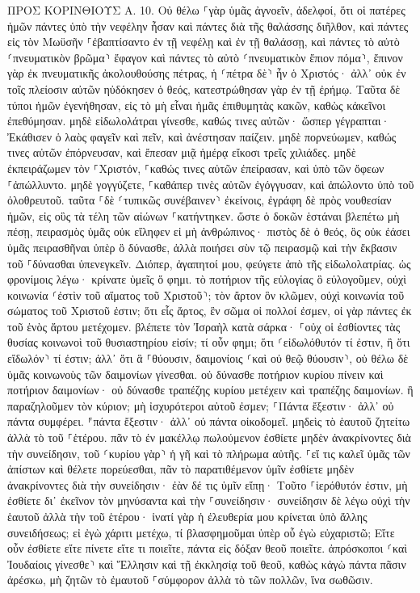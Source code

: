 \documentclass[twoside, 9pt]{extreport}
\begin{document}
ΠΡΟΣ ΚΟΡΙΝΘΙΟΥΣ Α.
10.
Οὐ θέλω ⸀γὰρ ὑμᾶς ἀγνοεῖν, ἀδελφοί, ὅτι οἱ πατέρες ἡμῶν πάντες ὑπὸ τὴν νεφέλην ἦσαν καὶ πάντες διὰ τῆς θαλάσσης διῆλθον, 
καὶ πάντες εἰς τὸν Μωϋσῆν ⸀ἐβαπτίσαντο ἐν τῇ νεφέλῃ καὶ ἐν τῇ θαλάσσῃ, 
καὶ πάντες τὸ αὐτὸ ⸂πνευματικὸν βρῶμα⸃ ἔφαγον 
καὶ πάντες τὸ αὐτὸ ⸂πνευματικὸν ἔπιον πόμα⸃, ἔπινον γὰρ ἐκ πνευματικῆς ἀκολουθούσης πέτρας, ἡ ⸂πέτρα δὲ⸃ ἦν ὁ Χριστός· 
ἀλλ᾽ οὐκ ἐν τοῖς πλείοσιν αὐτῶν ηὐδόκησεν ὁ θεός, κατεστρώθησαν γὰρ ἐν τῇ ἐρήμῳ. 
Ταῦτα δὲ τύποι ἡμῶν ἐγενήθησαν, εἰς τὸ μὴ εἶναι ἡμᾶς ἐπιθυμητὰς κακῶν, καθὼς κἀκεῖνοι ἐπεθύμησαν. 
μηδὲ εἰδωλολάτραι γίνεσθε, καθώς τινες αὐτῶν· ὥσπερ γέγραπται· Ἐκάθισεν ὁ λαὸς φαγεῖν καὶ πεῖν, καὶ ἀνέστησαν παίζειν. 
μηδὲ πορνεύωμεν, καθώς τινες αὐτῶν ἐπόρνευσαν, καὶ ἔπεσαν μιᾷ ἡμέρᾳ εἴκοσι τρεῖς χιλιάδες. 
μηδὲ ἐκπειράζωμεν τὸν ⸀Χριστόν, ⸀καθώς τινες αὐτῶν ἐπείρασαν, καὶ ὑπὸ τῶν ὄφεων ⸀ἀπώλλυντο. 
μηδὲ γογγύζετε, ⸀καθάπερ τινὲς αὐτῶν ἐγόγγυσαν, καὶ ἀπώλοντο ὑπὸ τοῦ ὀλοθρευτοῦ. 
ταῦτα ⸀δὲ ⸂τυπικῶς συνέβαινεν⸃ ἐκείνοις, ἐγράφη δὲ πρὸς νουθεσίαν ἡμῶν, εἰς οὓς τὰ τέλη τῶν αἰώνων ⸀κατήντηκεν. 
ὥστε ὁ δοκῶν ἑστάναι βλεπέτω μὴ πέσῃ, 
πειρασμὸς ὑμᾶς οὐκ εἴληφεν εἰ μὴ ἀνθρώπινος· πιστὸς δὲ ὁ θεός, ὃς οὐκ ἐάσει ὑμᾶς πειρασθῆναι ὑπὲρ ὃ δύνασθε, ἀλλὰ ποιήσει σὺν τῷ πειρασμῷ καὶ τὴν ἔκβασιν τοῦ ⸀δύνασθαι ὑπενεγκεῖν. 
Διόπερ, ἀγαπητοί μου, φεύγετε ἀπὸ τῆς εἰδωλολατρίας. 
ὡς φρονίμοις λέγω· κρίνατε ὑμεῖς ὅ φημι. 
τὸ ποτήριον τῆς εὐλογίας ὃ εὐλογοῦμεν, οὐχὶ κοινωνία ⸂ἐστὶν τοῦ αἵματος τοῦ Χριστοῦ⸃; τὸν ἄρτον ὃν κλῶμεν, οὐχὶ κοινωνία τοῦ σώματος τοῦ Χριστοῦ ἐστιν; 
ὅτι εἷς ἄρτος, ἓν σῶμα οἱ πολλοί ἐσμεν, οἱ γὰρ πάντες ἐκ τοῦ ἑνὸς ἄρτου μετέχομεν. 
βλέπετε τὸν Ἰσραὴλ κατὰ σάρκα· ⸀οὐχ οἱ ἐσθίοντες τὰς θυσίας κοινωνοὶ τοῦ θυσιαστηρίου εἰσίν; 
τί οὖν φημι; ὅτι ⸂εἰδωλόθυτόν τί ἐστιν, ἢ ὅτι εἴδωλόν⸃ τί ἐστιν; 
ἀλλ᾽ ὅτι ἃ ⸀θύουσιν, δαιμονίοις ⸂καὶ οὐ θεῷ θύουσιν⸃, οὐ θέλω δὲ ὑμᾶς κοινωνοὺς τῶν δαιμονίων γίνεσθαι. 
οὐ δύνασθε ποτήριον κυρίου πίνειν καὶ ποτήριον δαιμονίων· οὐ δύνασθε τραπέζης κυρίου μετέχειν καὶ τραπέζης δαιμονίων. 
ἢ παραζηλοῦμεν τὸν κύριον; μὴ ἰσχυρότεροι αὐτοῦ ἐσμεν; 
⸀Πάντα ἔξεστιν· ἀλλ᾽ οὐ πάντα συμφέρει. ⸁πάντα ἔξεστιν· ἀλλ᾽ οὐ πάντα οἰκοδομεῖ. 
μηδεὶς τὸ ἑαυτοῦ ζητείτω ἀλλὰ τὸ τοῦ ⸀ἑτέρου. 
πᾶν τὸ ἐν μακέλλῳ πωλούμενον ἐσθίετε μηδὲν ἀνακρίνοντες διὰ τὴν συνείδησιν, 
τοῦ ⸂κυρίου γὰρ⸃ ἡ γῆ καὶ τὸ πλήρωμα αὐτῆς. 
⸀εἴ τις καλεῖ ὑμᾶς τῶν ἀπίστων καὶ θέλετε πορεύεσθαι, πᾶν τὸ παρατιθέμενον ὑμῖν ἐσθίετε μηδὲν ἀνακρίνοντες διὰ τὴν συνείδησιν· 
ἐὰν δέ τις ὑμῖν εἴπῃ· Τοῦτο ⸀ἱερόθυτόν ἐστιν, μὴ ἐσθίετε δι᾽ ἐκεῖνον τὸν μηνύσαντα καὶ τὴν ⸀συνείδησιν· 
συνείδησιν δὲ λέγω οὐχὶ τὴν ἑαυτοῦ ἀλλὰ τὴν τοῦ ἑτέρου· ἱνατί γὰρ ἡ ἐλευθερία μου κρίνεται ὑπὸ ἄλλης συνειδήσεως; 
εἰ ἐγὼ χάριτι μετέχω, τί βλασφημοῦμαι ὑπὲρ οὗ ἐγὼ εὐχαριστῶ; 
Εἴτε οὖν ἐσθίετε εἴτε πίνετε εἴτε τι ποιεῖτε, πάντα εἰς δόξαν θεοῦ ποιεῖτε. 
ἀπρόσκοποι ⸂καὶ Ἰουδαίοις γίνεσθε⸃ καὶ Ἕλλησιν καὶ τῇ ἐκκλησίᾳ τοῦ θεοῦ, 
καθὼς κἀγὼ πάντα πᾶσιν ἀρέσκω, μὴ ζητῶν τὸ ἐμαυτοῦ ⸀σύμφορον ἀλλὰ τὸ τῶν πολλῶν, ἵνα σωθῶσιν. 
\end{document}
